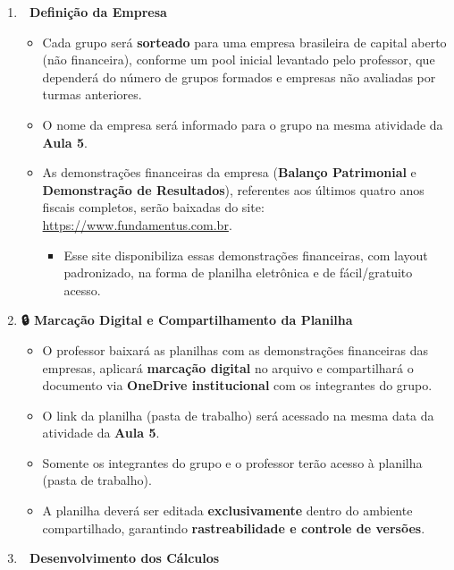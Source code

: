 \documentclass[
  a4paper,
]{book}
\providecommand{\tightlist}{%
  \setlength{\itemsep}{0pt}\setlength{\parskip}{0pt}}\usepackage{longtable,booktabs,array}
\begin{document}
\begin{enumerate}
\def\labelenumi{\arabic{enumi}.}
\setcounter{enumi}{1}
\item
  \textbf{🏢 Definição da Empresa}

  \begin{itemize}
  \item
    Cada grupo será \textbf{sorteado} para uma empresa brasileira de
    capital aberto (não financeira), conforme um pool inicial levantado
    pelo professor, que dependerá do número de grupos formados e
    empresas não avaliadas por turmas anteriores.\\
  \item
    O nome da empresa será informado para o grupo na mesma atividade da
    \textbf{Aula 5}.\\
  \item
    As demonstrações financeiras da empresa (\textbf{Balanço
    Patrimonial} e \textbf{Demonstração de Resultados}), referentes aos
    últimos quatro anos fiscais completos, serão baixadas do site:
    \url{https://www.fundamentus.com.br}.\\

    \begin{itemize}
    \tightlist
    \item
      Esse site disponibiliza essas demonstrações financeiras, com
      layout padronizado, na forma de planilha eletrônica e de
      fácil/gratuito acesso.
    \end{itemize}
  \end{itemize}
\item
  \textbf{🔒 Marcação Digital e Compartilhamento da Planilha}

  \begin{itemize}
  \item
    O professor baixará as planilhas com as demonstrações financeiras
    das empresas, aplicará \textbf{marcação digital} no arquivo e
    compartilhará o documento via \textbf{OneDrive institucional} com os
    integrantes do grupo.\\
  \item
    O link da planilha (pasta de trabalho) será acessado na mesma data
    da atividade da \textbf{Aula 5}.\\
  \item
    Somente os integrantes do grupo e o professor terão acesso à
    planilha (pasta de trabalho).\\
  \item
    A planilha deverá ser editada \textbf{exclusivamente} dentro do
    ambiente compartilhado, garantindo \textbf{rastreabilidade e
    controle de versões}.
  \end{itemize}
\item
  \textbf{🧮 Desenvolvimento dos Cálculos}


\end{enumerate}
\end{document}
